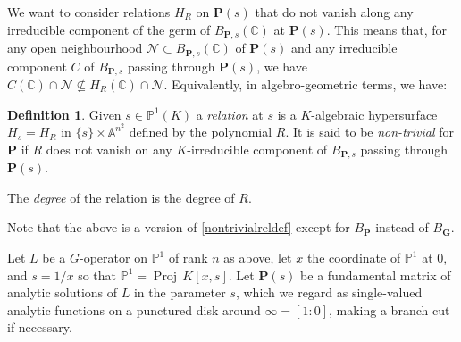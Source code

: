 \documentclass[10pt]{article}
\numberwithin{equation}{section}
\theoremstyle{plain}
\theoremstyle{definition}
\newtheorem{defn}[thm]{Definition}
\theoremstyle{remark}
\newcommand{\C}{\mathbb{C}}
\newcommand{\PP}{\mathbb{P}}
\begin{document}
We want to consider relations $H_{R}$ on $\mathbf{P}(s)$ that do not vanish along any irreducible component of the germ of $B_{\mathbf{P},s} (\C)$ at $\mathbf{P}(s)$. This means that, for any open neighbourhood $\mathcal{N} \subset B_{\mathbf{P},s}(\mathbb{C})$ of $\mathbf{P}(s)$ and any irreducible component $C$ of $B_{\mathbf{P},s}$ passing through $\mathbf{P}(s)$, we have $C(\C) \cap \mathcal{N} \nsubseteq H_R(\C) \cap \mathcal{N}$. Equivalently, in algebro-geometric terms, we have:  %
\begin{defn}\label{def:nontrivial}
Given $s \in \PP^1(K)$ a \emph{relation} at $s$ is a $K$-algebraic hypersurface $H_{s} = H_{R}$ in $\{ s \} \times \mathbb{A}^{n^2}$ defined by the polynomial $R$. It is said to be \emph{non-trivial} for $\mathbf{P}$ if $R$ does not vanish on any $K$-irreducible component of $B_{\mathbf{P},s}$ passing through $\mathbf{P}(s)$.

The \emph{degree} of the relation is the degree of $R$. 
\end{defn}
\noindent Note that the above is a version of \autoref{nontrivialreldef} except for $B_{\mathbf{P}}$ instead of $B_{\mathbf{G}}$.

Let $L$ be a $G$-operator on $\mathbb{P}^1$ of rank $n$ as above, let $x$ the coordinate of $\mathbb{P}^1$ at $0$, and $s = 1/x$ so that $\PP^1 = \operatorname{Proj}\, K[x, s]$. Let $\mathbf{P}(s)$ be a fundamental matrix of analytic solutions of $L$ in the parameter $s$, which we regard as single-valued analytic functions on a punctured disk around $\infty = [1 : 0]$, making a branch cut if necessary. 
\end{document}
